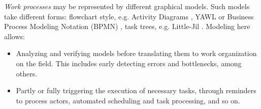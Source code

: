 
\emph{Work processes} may be represented by different graphical models. Such models take different forms: flowchart style, e.g. Activity Diagrams \cite{OMG:2004}, YAWL \cite{Vanderaalst:2005} or Business Process Modeling Notation (BPMN) \cite{OMG:2008}, task trees, e.g. Little-Jil \cite{Clarke:2008}. Modeling here allows:
\begin{itemize}
\item Analyzing and verifying models before translating them to work organization on the field. This includes early detecting errors and bottlenecks, among others.
\item Partly or fully triggering the execution of necessary tasks, through reminders to process actors, automated scheduling and task processing, and so on.
\end{itemize}
